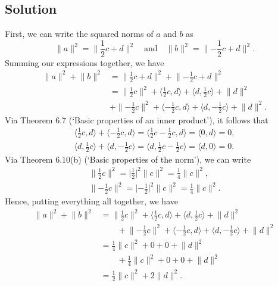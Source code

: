 \documentclass{article}
\providecommand{\abs}[1]{\lvert#1\rvert} \providecommand{\norm}[1]{\lVert#1\rVert}
\begin{document}
\subsection*{Solution}
First, we can write the squared norms of $a$ and $b$ as
\[\norm{a}^2=\norm{\frac{1}{2}c+d}^2\quad\text{and}\quad\norm{b}^2=\norm{-\frac{1}{2}c+d}^2.\]
Summing our expressions together, we have
\begin{align*}
    \norm{a}^2+\norm{b}^2&=\norm{\frac{1}{2}c+d}^2+\norm{-\frac{1}{2}c+d}^2\\
    &=\norm{\frac{1}{2}c}^2+\langle \frac{1}{2}c,d\rangle +\langle d,\frac{1}{2}c\rangle+\norm{d}^2\\
    &+\norm{-\frac{1}{2}c}^2+\langle -\frac{1}{2}c,d\rangle +\langle d,-\frac{1}{2}c\rangle+\norm{d}^2.
\end{align*}
Via Theorem 6.7 (`Basic properties of an inner product'), it follows that
\begin{gather*}
    \langle \frac{1}{2}c,d\rangle+\langle -\frac{1}{2}c,d\rangle=\langle\frac{1}{2}c-\frac{1}{2}c,d\rangle=\langle 0,d\rangle=0,\\
    \langle d,\frac{1}{2}c\rangle+\langle d,-\frac{1}{2}c\rangle=\langle d,\frac{1}{2}c-\frac{1}{2}c\rangle=\langle d,0\rangle=0.
\end{gather*}
Via Theorem 6.10(b) (`Basic properties of the norm'), we can write
\begin{gather*}
    \norm{\frac{1}{2}c}^2=\abs{\frac{1}{2}}^2\norm{c}^2=\frac{1}{4}\norm{c}^2,\\
    \norm{-\frac{1}{2}c}^2=\abs{-\frac{1}{2}}^2\norm{c}^2=\frac{1}{4}\norm{c}^2.
\end{gather*}
Hence, putting everything all together, we have
\begin{align*}
    \norm{a}^2+\norm{b}^2&=\norm{\frac{1}{2}c}^2+\langle \frac{1}{2}c,d\rangle +\langle d,\frac{1}{2}c\rangle+\norm{d}^2\\
    &\qquad +\norm{-\frac{1}{2}c}^2+\langle -\frac{1}{2}c,d\rangle +\langle d,-\frac{1}{2}c\rangle+\norm{d}^2\\
    &=\frac{1}{4}\norm{c}^2+ 0 + 0 +\norm{d}^2\\
    &\qquad +\frac{1}{4}\norm{c}^2+ 0 + 0 +\norm{d}^2\\
    &=\frac{1}{2}\norm{c}^2 + 2\norm{d}^2.
\end{align*}
\end{document}
